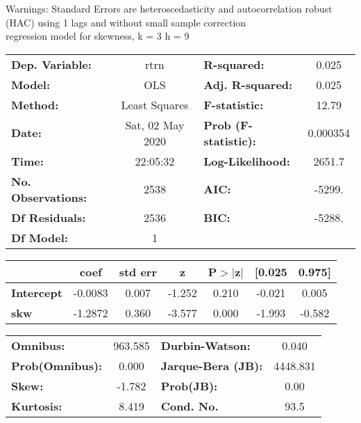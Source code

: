 Warnings: \newline
 [1] Standard Errors are heteroscedasticity and autocorrelation robust (HAC) using 1 lags and without small sample correction\\ 

regression model for skewness, k = 3 h = 9\begin{center}
\begin{tabular}{lclc}
\toprule
\textbf{Dep. Variable:}    &       rtrn       & \textbf{  R-squared:         } &     0.025   \\
\textbf{Model:}            &       OLS        & \textbf{  Adj. R-squared:    } &     0.025   \\
\textbf{Method:}           &  Least Squares   & \textbf{  F-statistic:       } &     12.79   \\
\textbf{Date:}             & Sat, 02 May 2020 & \textbf{  Prob (F-statistic):} &  0.000354   \\
\textbf{Time:}             &     22:05:32     & \textbf{  Log-Likelihood:    } &    2651.7   \\
\textbf{No. Observations:} &        2538      & \textbf{  AIC:               } &    -5299.   \\
\textbf{Df Residuals:}     &        2536      & \textbf{  BIC:               } &    -5288.   \\
\textbf{Df Model:}         &           1      & \textbf{                     } &             \\
\bottomrule
\end{tabular}
\begin{tabular}{lcccccc}
                   & \textbf{coef} & \textbf{std err} & \textbf{z} & \textbf{P$> |$z$|$} & \textbf{[0.025} & \textbf{0.975]}  \\
\midrule
\textbf{Intercept} &      -0.0083  &        0.007     &    -1.252  &         0.210        &       -0.021    &        0.005     \\
\textbf{skw}       &      -1.2872  &        0.360     &    -3.577  &         0.000        &       -1.993    &       -0.582     \\
\bottomrule
\end{tabular}
\begin{tabular}{lclc}
\textbf{Omnibus:}       & 963.585 & \textbf{  Durbin-Watson:     } &    0.040  \\
\textbf{Prob(Omnibus):} &   0.000 & \textbf{  Jarque-Bera (JB):  } & 4448.831  \\
\textbf{Skew:}          &  -1.782 & \textbf{  Prob(JB):          } &     0.00  \\
\textbf{Kurtosis:}      &   8.419 & \textbf{  Cond. No.          } &     93.5  \\
\bottomrule
\end{tabular}
\end{center}

